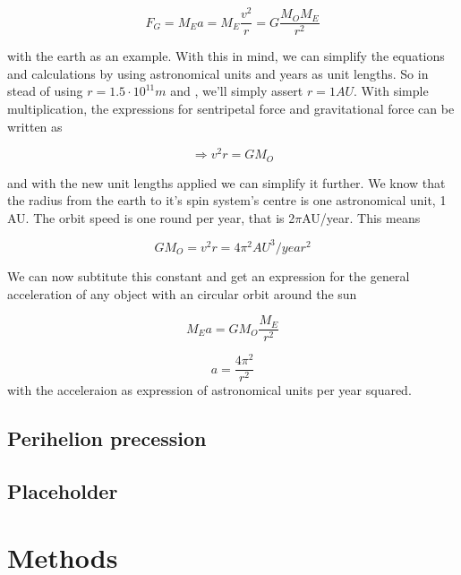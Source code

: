 \documentclass[10pt]{article}
\begin{document}
\begin{multicols}{2}
\begin{equation}
    F_G = M_Ea = M_E\frac{v^2}{r} = G\frac{M_OM_E}{r^2}
\end{equation}



with the earth as an example. With this in mind, we can simplify the
equations and calculations by using astronomical units and years as unit
lengths. So in stead of using $r = 1.5\cdot10^{11}m$ and , we'll simply
assert $r = 1AU$. With simple multiplication, the expressions for
sentripetal force and gravitational force can be written as 

\begin{equation}
    \Rightarrow v^2r = GM_O
\end{equation}

and with the new unit lengths applied we can simplify it further. We know
that the radius from the earth to it's spin system's centre is one
astronomical unit, 1 AU. The orbit speed is one round per year, that is
2$\pi$AU/year. This means

\begin{equation}
    GM_O = v^2r = 4\pi^2AU^3/year^2
\end{equation}

We can now subtitute this constant and get an expression for the general
acceleration of any object with an circular orbit around the sun

\begin{equation}
    M_Ea = GM_O\frac{M_E}{r^2}
\end{equation}

\begin{equation}
    a = \frac{4\pi^2}{r^2}
\end{equation}
with the acceleraion as expression of astronomical units per year squared. 

\subsection{Perihelion precession}
\subsection{Placeholder}

\section{Methods}


\end{multicols}
\end{document}
